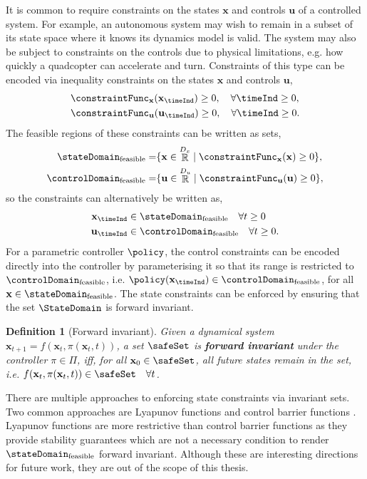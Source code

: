 \documentclass{mimosis-class/mimosis}
\newtheorem{definition}{Definition}[section]
\numberwithin{equation}{chapter}
\DeclareMathOperator{\R}{\mathbb{R}}
\newcommand{\StateDim}{\ensuremath{{D_x}}}
\newcommand{\ControlDim}{\ensuremath{{D_u}}}
\newcommand{\state}{\ensuremath{\mathbf{x}}}
\newcommand{\control}{\ensuremath{\mathbf{u}}}
\begin{document}
It is common to require constraints on the states \(\state\) and controls \(\control\) of a controlled system.
For example, an autonomous system may wish to remain in a subset of its state space where it knows its dynamics model
is valid.
The system may also be subject to constraints on the controls due to physical limitations, e.g.
how quickly a quadcopter can accelerate and turn.
Constraints of this type can be encoded via inequality constraints on the states \(\state\) and controls \(\control\),
\begin{align} \label{eq-}
&\constraintFunc_\state(\state_\timeInd) \geq 0, \quad \forall \timeInd \geq 0, \\
&\constraintFunc_\control(\control_\timeInd) \geq 0, \quad \forall \timeInd \geq 0.
\end{align}
The feasible regions of these constraints can be written as sets,
\begin{align} \label{eq-}
\stateDomain_{\text{feasible}} = &\{ \state \in \R^\StateDim \mid \constraintFunc_\state(\state) \geq 0 \}, \\
\controlDomain_{\text{feasible}} = &\{ \control \in \R^\ControlDim \mid \constraintFunc_\control(\control) \geq 0 \},
\end{align}
so the constraints can alternatively be written as,
\begin{align} \label{eq-}
\state_\timeInd &\in \stateDomain_{\text{feasible}}  \quad \forall t \geq 0 \\
\control_\timeInd &\in \controlDomain_{\text{feasible}} \quad \forall t \geq 0.
\end{align}
For a parametric controller \(\policy\), the control constraints can be encoded directly into the controller by
parameterising it so that its range is restricted to \(\controlDomain_{\text{feasible}}\),
i.e. \(\policy(\state_\timeInd) \in \controlDomain_{\text{feasible}}\),
for all \(\state \in \stateDomain_{\text{feasible}}\).
The state constraints can be enforced by ensuring that the set \(\StateDomain\) is forward invariant.
\begin{definition}[Forward invariant]
Given a dynamical system $\state_{t+1} = f(\state_t, \pi(\state_t, t))$,
a set $\safeSet$ is \textbf{forward invariant} under the controller $\pi \in \Pi$, iff, for all $\state_0 \in \safeSet$,
all future states remain in the set, i.e.  $f(\state_t, \pi(\state_t, t)) \in \safeSet \quad \forall t$.
\end{definition}
There are multiple approaches to enforcing state constraints via invariant sets.
Two common approaches are
Lyapunov functions \citep{lyapunovGeneral1992a} and control barrier functions \citep{amesControl2019}.
Lyapunov functions are more restrictive than control barrier functions as they provide stability guarantees
which are not a necessary condition to render \(\stateDomain_{\text{feasible}}\) forward invariant.
Although these are interesting directions for future work, they are out of the scope of this thesis.
\end{document}
